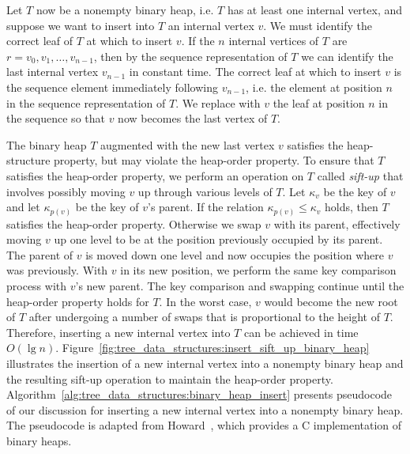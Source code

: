 Let $T$ now be a nonempty binary heap, i.e. $T$ has at least one
internal vertex, and suppose we want to insert into $T$ an internal
vertex $v$. We must identify the correct leaf of $T$ at which to
insert $v$. If the $n$ internal vertices of $T$ are
$r = v_0, v_1, \dots, v_{n-1}$, then by the sequence representation of
$T$ we can identify the last internal vertex $v_{n-1}$ in constant
time. The correct leaf at which to insert $v$ is the sequence element
immediately following $v_{n-1}$, i.e. the element at position $n$ in
the sequence representation of $T$. We replace with $v$ the leaf at
position $n$ in the sequence so that $v$ now becomes the last vertex
of $T$.

The binary heap $T$ augmented with the new last vertex $v$ satisfies
the heap-structure property, but may violate the heap-order
property. To ensure that $T$ satisfies the heap-order property, we
perform an operation on $T$ called
\emph{sift-up} that involves possibly
moving $v$ up through various levels of $T$. Let $\kappa_v$ be the key
of $v$ and let $\kappa_{p(v)}$ be the key of $v$'s parent. If the
relation $\kappa_{p(v)} \leq \kappa_v$ holds, then $T$ satisfies the
heap-order property. Otherwise we swap $v$ with its parent,
effectively moving $v$ up one level to be at the position previously
occupied by its parent. The parent of $v$ is moved down one level and
now occupies the position where $v$ was previously. With $v$ in its
new position, we perform the same key comparison process with $v$'s
new parent. The key comparison and swapping continue until the
heap-order property holds for $T$. In the worst case, $v$ would become
the new root of $T$ after undergoing a number of swaps that is
proportional to the height of $T$. Therefore, inserting a new internal
vertex into $T$ can be achieved in time $O(\lg n)$.
Figure~\ref{fig:tree_data_structures:insert_sift_up_binary_heap}
illustrates the insertion of a new internal vertex into a nonempty
binary heap and the resulting sift-up operation to maintain the
heap-order property.
Algorithm~\ref{alg:tree_data_structures:binary_heap_insert} presents
pseudocode of our discussion for inserting a new internal vertex into
a nonempty binary heap. The pseudocode is adapted from
Howard~\cite{Howard2010}, which provides a C implementation of binary
heaps.

